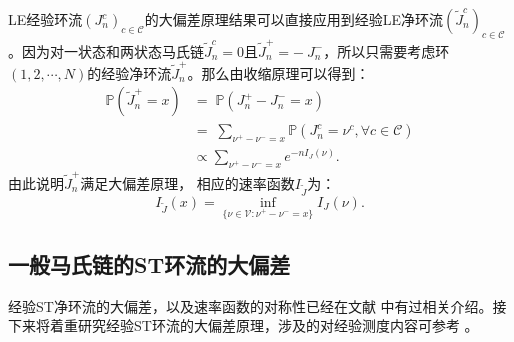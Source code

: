 LE经验环流$(J^{c}_n)_{c\in\mathcal{C}}$的大偏差原理结果可以直接应用到经验LE净环流$(\tilde{J}^{c}_n)_{c\in\mathcal{C}}$。因为对一状态和两状态马氏链$\tilde{J}^c_n = 0$且$\tilde{J}^+_n = -\ {J}^-_n$，所以只需要考虑环$(1, 2, \cdots ,N)$的经验净环流$\tilde{J}^+_n$。那么由收缩原理可以得到：
\begin{equation}\label{tilde I J}
	\begin{split}
		\mathbb{P}\left(\tilde{J}^{+}_n = x\right)
		&=\;\mathbb{P}\left(J^{+}_n-J^{-}_n = x\right)\\
		&=\;\sum_{\nu^{+}-\nu^{-}=x}\mathbb{P}\left(J^{c}_n=\nu^{c},\forall c\in\mathcal{C}\right)\\
		&\propto\sum_{\nu^{+}-\nu^{-}=x} e^{-nI_J(\nu)}.
	\end{split}
\end{equation}
由此说明$\tilde{J}^+_n$满足大偏差原理， 相应的速率函数$I_{\tilde{J}}$为：
\begin{equation*}
	I_{\tilde{J}}(x)=\inf_{\{\nu\in\mathcal{V}:\nu^{+}-\nu^{-}= x\}}I_J(\nu).
\end{equation*} 



\subsection{一般马氏链的ST环流的大偏差}

经验ST净环流的大偏差，以及速率函数的对称性已经在文献 \cite{bertini2015flows} 中有过相关介绍。接下来将着重研究经验ST环流的大偏差原理，涉及的对经验测度内容可参考 \cite{den2008large}。

